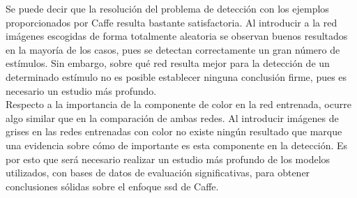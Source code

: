 Se puede decir que la resolución del problema de detección con los ejemplos proporcionados por Caffe resulta bastante satisfactoria. Al introducir a la red imágenes escogidas de forma totalmente aleatoria se observan buenos resultados en la mayoría de los casos, pues se detectan correctamente un gran número de estímulos. Sin embargo, sobre qué red resulta mejor para la detección de un determinado estímulo no es posible establecer ninguna conclusión firme, pues es necesario un estudio más profundo.\\

Respecto a la importancia de la componente de color en la red entrenada, ocurre algo similar que en la comparación de ambas redes. Al introducir imágenes de grises en las redes entrenadas con color no existe ningún resultado que marque una evidencia sobre cómo de importante es esta componente en la detección. Es por esto que será necesario realizar un estudio más profundo de los modelos utilizados, con bases de datos de evaluación significativas, para obtener conclusiones sólidas sobre el enfoque \acrshort{ssd} de Caffe.\\

